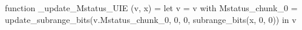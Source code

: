 function _update_Mstatus_UIE (v, x) = let v = { v with Mstatus_chunk_0 = update_subrange_bits(v.Mstatus_chunk_0, 0, 0, subrange_bits(x, 0, 0)) } in
  v
